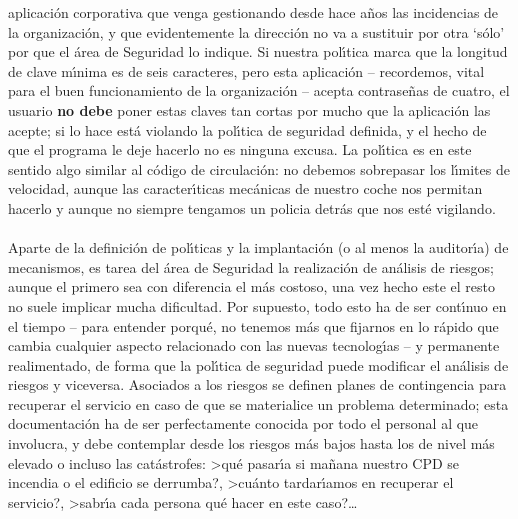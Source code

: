 aplicaci\'on corporativa que venga gestionando desde hace a\~nos las
incidencias de la organizaci\'on, y que evidentemente la direcci\'on no va a 
sustituir por otra `s\'olo' por que el \'area de Seguridad lo indique. Si 
nuestra pol\'{\i}tica marca que la longitud de clave m\'{\i}nima es
de seis caracteres, pero esta aplicaci\'on -- recordemos, vital para el buen
funcionamiento de la organizaci\'on -- acepta contrase\~nas de cuatro, el 
usuario {\bf no debe} poner estas claves tan cortas por mucho que la 
aplicaci\'on las acepte; si lo hace
est\'a violando la pol\'{\i}tica de seguridad definida, y el hecho de que el 
programa le deje hacerlo no es ninguna excusa. La pol\'{\i}tica es en este 
sentido algo similar al c\'odigo de circulaci\'on: no debemos sobrepasar los 
l\'{\i}mites de velocidad, aunque las caracter\'{\i}ticas mec\'anicas de 
nuestro coche nos permitan hacerlo y aunque no siempre tengamos un policia 
detr\'as que nos est\'e vigilando.\\
\\Aparte de la definici\'on de pol\'{\i}ticas y la implantaci\'on (o al menos la
auditor\'{\i}a) de 
mecanismos, es tarea del \'area de Seguridad la realizaci\'on de an\'alisis de
riesgos; aunque el primero sea con diferencia el m\'as costoso, una vez hecho
este el resto no suele implicar mucha dificultad. Por supuesto, todo esto ha de
ser cont\'{\i}nuo en el tiempo -- para entender porqu\'e, no tenemos m\'as que
fijarnos en lo r\'apido que cambia cualquier aspecto relacionado con las 
nuevas tecnolog\'{\i}as -- y permanente realimentado, de forma que la 
pol\'{\i}tica de seguridad puede modificar el an\'alisis de riesgos y 
viceversa. Asociados a los riesgos se definen planes de contingencia para
recuperar el servicio en caso de que se materialice un problema determinado;
esta documentaci\'on ha de ser perfectamente conocida por todo el personal al
que involucra, y debe contemplar desde los riesgos m\'as bajos hasta los de
nivel m\'as elevado o incluso las cat\'astrofes: >qu\'e pasar\'{\i}a si 
ma\~nana nuestro CPD se incendia o el edificio se derrumba?, >cu\'anto 
tardar\'{\i}amos en recuperar el servicio?, >sabr\'{\i}a cada persona qu\'e 
hacer en este caso?\ldots 
